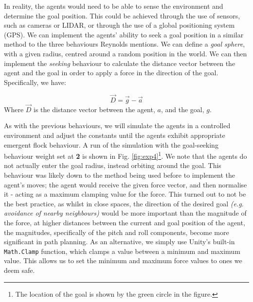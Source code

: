 \documentclass[12pt]{article}
\begin{document}
In reality, the agents would need to be able to sense the environment and determine the goal position. This could be achieved through the use of sensors, such as cameras or LIDAR, or through the use of a global positioning system (GPS)\cite{Petrillo,burwell_2019}. We can implement the agents' ability to seek a goal position in a similar method to the three behaviours Reynolds mentions. We can define a \emph{goal sphere}, with a given radius, centred around a random position in the world. We can then implement the \emph{seeking} behaviour to calculate the distance vector between the agent and the goal in order to apply a force in the direction of the goal. Specifically, we have:

\begin{equation}
\vec{D} = \vec{g} - \vec{a}
\end{equation}
Where $\vec{D}$ is the distance vector between the agent, $a$, and the goal, $g$.

As with the previous behaviours, we will simulate the agents in a controlled environment and adjust the constants until the agents exhibit appropriate emergent flock behaviour. A run of the simulation with the goal-seeking behaviour weight set at \textbf{2} is shown in Fig. \ref{fig:exp4}\footnote{The location of the goal is shown by the green circle in the figure.}. We note that the agents do not actually enter the goal radius, instead orbiting around the goal. This behaviour was likely down to the method being used before to implement the agent's moves; the agent would receive the given force vector, and then normalise it - acting as a maximum clamping value for the force. This turned out to not be the best practice, as whilst in close spaces, the direction of the desired goal \emph{(e.g. avoidance of nearby neighbours)} would be more important than the magnitude of the force, at higher distances between the current and goal position of the agent, the magnitudes, specifically of the pitch and roll components, become more significant in path planning. As an alternative, we simply use Unity's built-in \verb|Math.Clamp| function, which clamps a value between a minimum and maximum value. This allows us to set the minimum and maximum force values to ones we deem safe.
\end{document}
